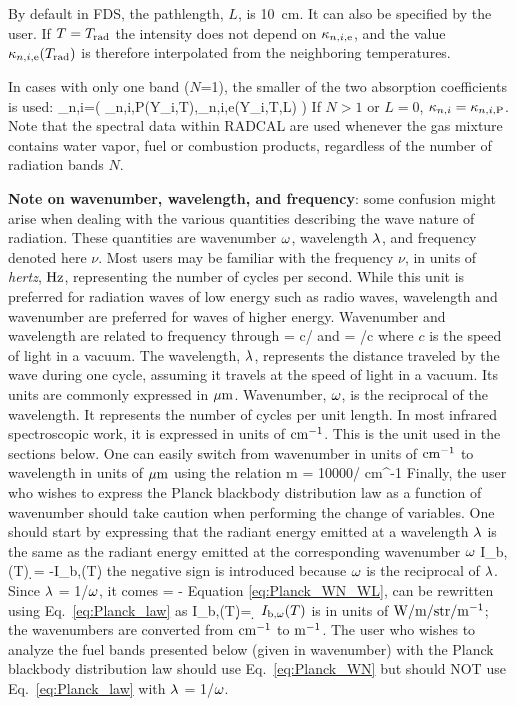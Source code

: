 By default in FDS, the pathlength, $L$, is 10~cm. It can also be specified by the user. If $T=T_{\rm rad}$ the intensity does not depend on $\kappa_{n,i,{\rm e}}$, and the value $\kappa_{n,i,{\rm e}}(T_{\rm rad})$ is therefore interpolated from the neighboring temperatures.

In cases with only one band ($N$=1), the smaller of the two absorption coefficients is used:
\be
   \kappa_{n,i}=\min \Big( \kappa_{n,i,{\rm P}}(Y_i,T),\kappa_{n,i,{\rm e}}(Y_i,T,L) \Big)
\ee
If $N>1$ or $L=0$, $\kappa_{n,i}=\kappa_{n,i,{\rm P}}$. Note that the spectral data within RADCAL are used whenever the gas mixture contains water vapor, fuel or combustion products, regardless of the number of radiation bands $N$.

\textbf{Note on wavenumber, wavelength, and frequency}: some confusion might arise when dealing with the various quantities describing the wave nature of radiation. These quantities are wavenumber $\omega$, wavelength $\lambda$, and frequency denoted here $\nu$. Most users may be familiar with the frequency $\nu$, in units of \textit{hertz}, ${\rm Hz}$, representing the number of cycles per second. While this unit is preferred for radiation waves of low energy such as radio waves, wavelength and wavenumber are preferred for waves of higher energy. Wavenumber and wavelength are related to frequency through \cite{Penner:1959}
\be
 \la = c/\nu \: \: \rm{and} \: \: \om = \nu /c
\ee
where $c$ is the speed of light in a vacuum. The wavelength, $\lambda$, represents the distance traveled by the wave during one cycle, assuming it travels at the speed of light in a vacuum. Its units are commonly expressed in ${\rm \mu m}$. Wavenumber, $\omega$, is the reciprocal of the wavelength. It represents the number of cycles per unit length. In most infrared spectroscopic work, it is expressed in units of ${\rm cm^{-1}}$. This is the unit used in the sections below. One can  easily switch from wavenumber in units of ${\rm cm^{-1}}$ to wavelength in units of ${\rm \mu m}$ using the relation
\be
  \la \; {\rm \mu m}  \; = 10000/\om \; \; {\rm cm^{-1}}
\ee
Finally, the user who wishes to express the Planck blackbody distribution law
as a function of wavenumber should take caution when performing the change of variables. One should start by expressing that the radiant energy emitted
at a wavelength $\lambda$ is the same as the radiant energy emitted at the corresponding wavenumber $\omega$ \cite{Tien:1968}
\be \label{eq:Planck_WN_WL}
I_{\rm b,\la}(T) \d \la = -I_{\rm b,\om}(T)\d \om
\ee
the negative sign is introduced because $\omega$ is the reciprocal of $\lambda$.
Since $\lambda$ = 1/$\omega$, it comes
\be
\dfrac{\d \la}{\d \om} = -
\ee
Equation \ref{eq:Planck_WN_WL},
can be rewritten using Eq.~\ref{eq:Planck_law} as
\be\label{eq:Planck_WN}
  I_{\rm b,\om}(T)\d \om = \d \om
\ee
$I_{\rm b,\omega}(T)$ is in units of $\rm{W/m/str/m^{-1}}$; the wavenumbers are converted from $\rm{cm^{-1}}$ to $\rm{m^{-1}}$.
The user who wishes to analyze the fuel bands presented below (given in wavenumber) with the Planck blackbody distribution law should use Eq.~\ref{eq:Planck_WN} but should NOT use Eq.~\ref{eq:Planck_law} with $\lambda$ = 1/$\omega$.


